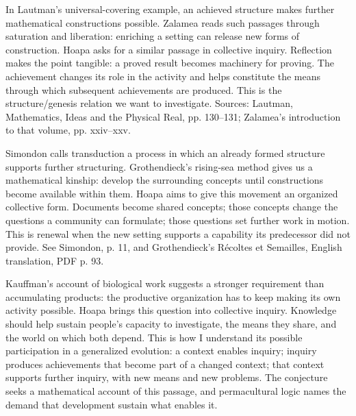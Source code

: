 \documentclass[a4paper,10pt]{article}
\newcommand{\marked}[1]{\par\addvspace{2pt}{\bfseries #1}\par\nopagebreak}
\renewenvironment{leftbar}{%
  \def\FrameCommand{{\color{black!30}\vrule width 1.2pt}\hspace{6pt}}%
  \MakeFramed{\advance\hsize-\width \FrameRestore}}{\endMakeFramed}
\newenvironment{commentary}{\par\vspace{-2pt}\begin{leftbar}\color{black!80}}{\end{leftbar}}
\begin{document}
\begin{commentary}
\marked{\textcolor{reflectionviolet}{Reflection}}
In Lautman's universal-covering example, an achieved structure makes further mathematical constructions possible. Zalamea reads such passages through saturation and liberation: enriching a setting can release new forms of construction. Hoapa asks for a similar passage in collective inquiry. Reflection makes the point tangible: a proved result becomes machinery for proving. The achievement changes its role in the activity and helps constitute the means through which subsequent achievements are produced. This is the structure/genesis relation we want to investigate. Sources: Lautman, Mathematics, Ideas and the Physical Real, pp. 130–131; Zalamea's introduction to that volume, pp. xxiv–xxv.\par
\marked{\textcolor{emergencecoral}{Renewal}}
Simondon calls transduction a process in which an already formed structure supports further structuring. Grothendieck's rising-sea method gives us a mathematical kinship: develop the surrounding concepts until constructions become available within them. Hoapa aims to give this movement an organized collective form. Documents become shared concepts; those concepts change the questions a community can formulate; those questions set further work in motion. This is renewal when the new setting supports a capability its predecessor did not provide. See Simondon, p. 11, and Grothendieck's Récoltes et Semailles, English translation, PDF p. 93.\par
\marked{\textcolor{permaculturegreen}{Conditions of activity}}
Kauffman's account of biological work suggests a stronger requirement than accumulating products: the productive organization has to keep making its own activity possible. Hoapa brings this question into collective inquiry. Knowledge should help sustain people's capacity to investigate, the means they share, and the world on which both depend. This is how I understand its possible participation in a generalized evolution: a context enables inquiry; inquiry produces achievements that become part of a changed context; that context supports further inquiry, with new means and new problems. The conjecture seeks a mathematical account of this passage, and permacultural logic names the demand that development sustain what enables it.\par
\end{commentary}
\end{document}
